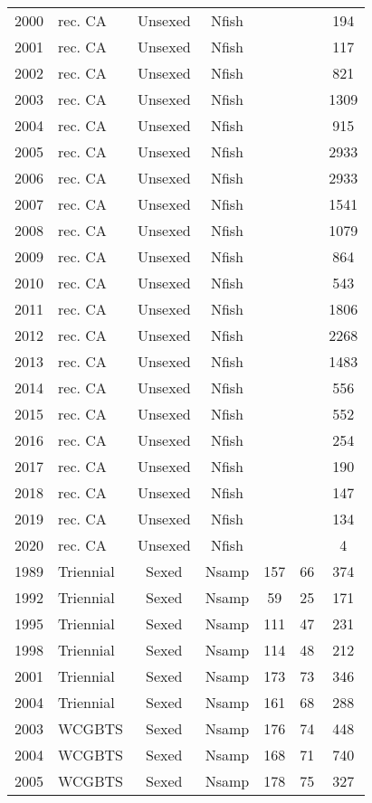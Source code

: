 \begin{longtable}[t]{c>{\centering\arraybackslash}p{3cm}ccccc}
2000 & rec. CA & Unsexed & Nfish &  &  & 194\\
2001 & rec. CA & Unsexed & Nfish &  &  & 117\\
2002 & rec. CA & Unsexed & Nfish &  &  & 821\\
2003 & rec. CA & Unsexed & Nfish &  &  & 1309\\
2004 & rec. CA & Unsexed & Nfish &  &  & 915\\
2005 & rec. CA & Unsexed & Nfish &  &  & 2933\\
2006 & rec. CA & Unsexed & Nfish &  &  & 2933\\
2007 & rec. CA & Unsexed & Nfish &  &  & 1541\\
2008 & rec. CA & Unsexed & Nfish &  &  & 1079\\
2009 & rec. CA & Unsexed & Nfish &  &  & 864\\
2010 & rec. CA & Unsexed & Nfish &  &  & 543\\
2011 & rec. CA & Unsexed & Nfish &  &  & 1806\\
2012 & rec. CA & Unsexed & Nfish &  &  & 2268\\
2013 & rec. CA & Unsexed & Nfish &  &  & 1483\\
2014 & rec. CA & Unsexed & Nfish &  &  & 556\\
2015 & rec. CA & Unsexed & Nfish &  &  & 552\\
2016 & rec. CA & Unsexed & Nfish &  &  & 254\\
2017 & rec. CA & Unsexed & Nfish &  &  & 190\\
2018 & rec. CA & Unsexed & Nfish &  &  & 147\\
2019 & rec. CA & Unsexed & Nfish &  &  & 134\\
2020 & rec. CA & Unsexed & Nfish &  &  & 4\\
1989 & Triennial & Sexed & Nsamp & 157 & 66 & 374\\
1992 & Triennial & Sexed & Nsamp & 59 & 25 & 171\\
1995 & Triennial & Sexed & Nsamp & 111 & 47 & 231\\
1998 & Triennial & Sexed & Nsamp & 114 & 48 & 212\\
2001 & Triennial & Sexed & Nsamp & 173 & 73 & 346\\
2004 & Triennial & Sexed & Nsamp & 161 & 68 & 288\\
2003 & WCGBTS & Sexed & Nsamp & 176 & 74 & 448\\
2004 & WCGBTS & Sexed & Nsamp & 168 & 71 & 740\\
2005 & WCGBTS & Sexed & Nsamp & 178 & 75 & 327\\

\end{longtable}
